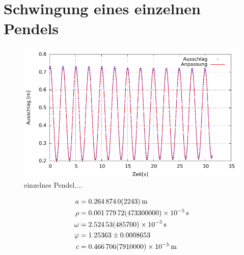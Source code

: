 \section{Schwingung eines einzelnen Pendels}




\begin{figure}[h!]
	\centering
	\includegraphics[width=0.7\linewidth]{Auswertung/einfach/einzelnesPendel.pdf}
	\caption{einzelnes Pendel....}
	\label{fig:einzelnespendel}
\end{figure}




\begin{align*}
	a               &= \SI{ 0.264874        \pm 0.0002243}{m}   \\
	\rho             &=\SI{ 0.00177972      \pm 4.733e-005 }{\per s} \\
	\omega            &= \SI{2.52453         \pm 4.857e-005}{\per s}  \\
	\varphi            &= 1.25363         \pm 0.0008653    \\
	c               &=\SI{ 0.466706        \pm 7.91e-005}{m}    \\
	\end{align*}